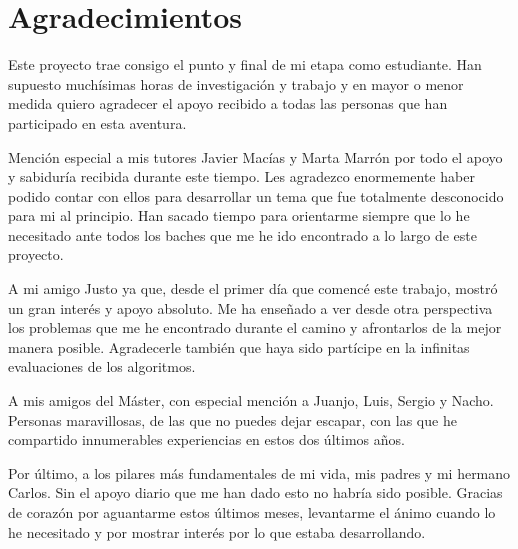 
\chapter*{Agradecimientos}
\label{cha:agradecimientos}

Este proyecto trae consigo el punto y final de mi etapa como estudiante. Han supuesto muchísimas horas de investigación y trabajo y en mayor o menor medida quiero agradecer el apoyo recibido a todas las personas que han participado en esta aventura.

Mención especial a mis tutores Javier Macías y Marta Marrón por todo el apoyo y sabiduría recibida durante este tiempo. Les agradezco enormemente haber podido contar con ellos para desarrollar un tema que fue totalmente desconocido para mi al principio. Han sacado tiempo para orientarme siempre que lo he necesitado ante todos los baches que me he ido encontrado a lo largo de este proyecto.

A mi amigo Justo ya que, desde el primer día que comencé este trabajo, mostró un gran interés y apoyo absoluto. Me ha enseñado a ver desde otra perspectiva los problemas que me he encontrado durante el camino y afrontarlos de la mejor manera posible. Agradecerle también que haya sido partícipe en la infinitas evaluaciones de los algoritmos.

A mis amigos del Máster, con especial mención a Juanjo, Luis, Sergio y Nacho. Personas maravillosas, de las que no puedes dejar escapar, con las que he compartido innumerables experiencias en estos dos últimos años.

Por último, a los pilares más fundamentales de mi vida, mis padres y mi hermano Carlos. Sin el apoyo diario que me han dado esto no habría sido posible. Gracias de corazón por aguantarme estos últimos meses, levantarme el ánimo cuando lo he necesitado y por mostrar interés por lo que estaba desarrollando. 